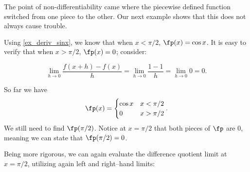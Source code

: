 The point of non-differentiability came where the piecewise defined function switched from one piece to the other. Our next example shows that this does not always cause trouble.\bigskip

{Using \autoref{ex_deriv_sinx}, we know that when $x<\pi/2$, $\fp(x) = \cos x$. It is easy to verify that when $x>\pi/2$, $\fp(x) = 0$; consider:


\[
 \lim_{h\to0}\frac{f(x+h) - f(x)}{h}
 = \lim_{h\to0}\frac{1-1}{h} = \lim_{h\to0}0 =0.
\]

So far we have
\[\fp(x) = \begin{cases}\cos x & x<\pi/2\\ 0 & x>\pi/2\end{cases}.\]
We still need to find $\fp(\pi/2)$. Notice at $x=\pi/2$ that both pieces of $\fp$ are 0, meaning we can state that $\fp(\pi/2)=0$. 

Being more rigorous, we can again evaluate the difference quotient limit at $x=\pi/2$, utilizing again left and right--hand limits:\\

}
